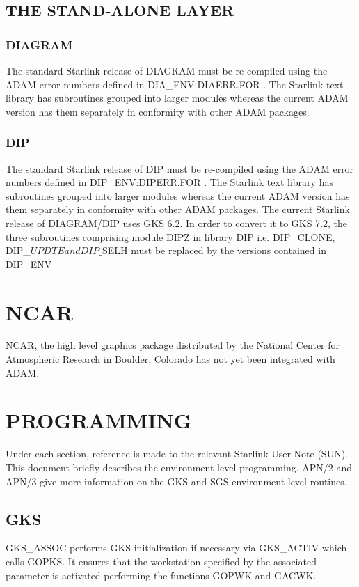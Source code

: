 \subsection{THE STAND-ALONE LAYER}

\subsubsection{DIAGRAM}
The standard Starlink release of DIAGRAM must be re-compiled using
the ADAM error numbers defined in DIA\_ENV:DIAERR.FOR .
The Starlink text library has
subroutines grouped into larger modules whereas the current ADAM version
has them separately in conformity with other ADAM packages.

\subsubsection{DIP}
The standard Starlink release of DIP must be re-compiled using
the ADAM error numbers defined in DIP\_ENV:DIPERR.FOR .
The Starlink text library has
subroutines grouped into larger modules whereas the current ADAM version
has them separately in conformity with other ADAM packages.
The current Starlink release of DIAGRAM/DIP uses GKS 6.2. In order to convert
it to GKS 7.2, the three subroutines comprising module DIPZ in library DIP
i.e. DIP\_CLONE, DIP\_$UPDTE and DIP\_$SELH must be replaced by the versions
contained in DIP\_ENV

\section{NCAR}
NCAR, the high level graphics package distributed by the National Center for
Atmospheric Research in Boulder, Colorado has not yet been integrated with
ADAM.

\section{PROGRAMMING}
Under each section, reference is made to the relevant Starlink User Note
(SUN). This document briefly describes the environment level programming,
APN/2 and APN/3 give more information on the GKS and SGS environment-level
routines.

\subsection{GKS}
GKS\_ASSOC performs GKS initialization if necessary via GKS\_ACTIV which
calls GOPKS. It ensures that the workstation specified by the associated
parameter is activated performing the functions GOPWK and GACWK.

